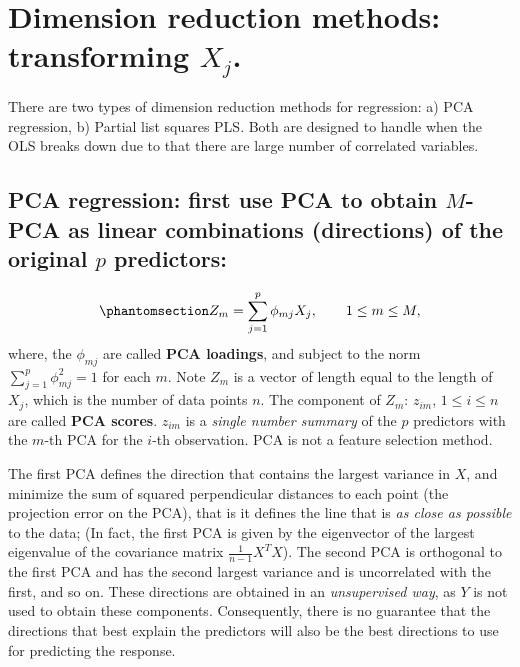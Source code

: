 \documentclass[
  letterpaper,
  DIV=11,
  numbers=noendperiod]{scrreprt}
\begin{document}
\section{\texorpdfstring{Dimension reduction methods: transforming
\(X_j\).}{Dimension reduction methods: transforming X\_j.}}\label{dimension-reduction-methods-transforming-x_j.}

There are two types of dimension reduction methods for regression: a)
PCA regression, b) Partial list squares PLS. Both are designed to handle
when the OLS breaks down due to that there are large number of
correlated variables.

\subsection{\texorpdfstring{PCA regression: first use PCA to obtain
\(M\)- PCA as linear combinations (directions) of the original \(p\)
predictors:}{PCA regression: first use PCA to obtain M- PCA as linear combinations (directions) of the original p predictors:}}\label{pca-regression-first-use-pca-to-obtain-m--pca-as-linear-combinations-directions-of-the-original-p-predictors}

\begin{equation}\phantomsection\label{eq-PCA}{
  Z_m =\sum_{j=1}^p \phi_{mj} X_j, \qquad 1\le m \le M,  
  }\end{equation} where, the \(\phi_{mj}\) are called \textbf{PCA
loadings}, and subject to the norm \(\sum_{j=1}^p\phi_{mj}^2=1\) for
each \(m\). Note \(Z_m\) is a vector of length equal to the length of
\(X_j\), which is the number of data points \(n\). The component of
\(Z_m\): \(z_{im}\), \(1\le i \le n\) are called \textbf{PCA scores}.
\(z_{im}\) is a \emph{single number summary} of the \(p\) predictors
with the \(m\)-th PCA for the \(i\)-th observation. PCA is not a feature
selection method.

The first PCA defines the direction that contains the largest variance
in \(X\), and minimize the sum of squared perpendicular distances to
each point (the projection error on the PCA), that is it defines the
line that is \emph{as close as possible} to the data; (In fact, the
first PCA is given by the eigenvector of the largest eigenvalue of the
covariance matrix \(\frac{1}{n-1}X^TX\)). The second PCA is orthogonal
to the first PCA and has the second largest variance and is uncorrelated
with the first, and so on. These directions are obtained in an
\emph{unsupervised way}, as \(Y\) is not used to obtain these
components. Consequently, there is no guarantee that the directions that
best explain the predictors will also be the best directions to use for
predicting the response.
\end{document}
